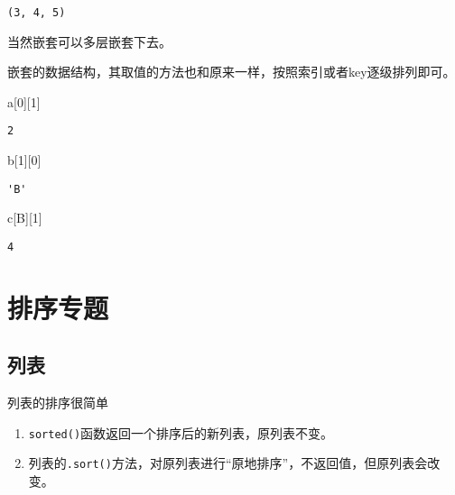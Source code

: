 \documentclass[
  letterpaper,
  DIV=11,
  numbers=noendperiod]{scrreprt}
\newenvironment{Shaded}{\begin{snugshade}}{\end{snugshade}}
\newcommand{\DecValTok}[1]{\textcolor[rgb]{0.68,0.00,0.00}{#1}}
\newcommand{\NormalTok}[1]{\textcolor[rgb]{0.00,0.23,0.31}{#1}}
\newcommand{\StringTok}[1]{\textcolor[rgb]{0.13,0.47,0.30}{#1}}
\providecommand{\tightlist}{%
  \setlength{\itemsep}{0pt}\setlength{\parskip}{0pt}}\usepackage{longtable,booktabs,array}
\begin{document}
\begin{verbatim}
(3, 4, 5)
\end{verbatim}

当然嵌套可以多层嵌套下去。

嵌套的数据结构，其取值的方法也和原来一样，按照索引或者key逐级排列即可。

\begin{Shaded}
\begin{Highlighting}[]
\NormalTok{a[}\DecValTok{0}\NormalTok{][}\DecValTok{1}\NormalTok{]}
\end{Highlighting}
\end{Shaded}

\begin{verbatim}
2
\end{verbatim}

\begin{Shaded}
\begin{Highlighting}[]
\NormalTok{b[}\DecValTok{1}\NormalTok{][}\DecValTok{0}\NormalTok{]}
\end{Highlighting}
\end{Shaded}

\begin{verbatim}
'B'
\end{verbatim}

\begin{Shaded}
\begin{Highlighting}[]
\NormalTok{c[}\StringTok{\textquotesingle{}B\textquotesingle{}}\NormalTok{][}\DecValTok{1}\NormalTok{]}
\end{Highlighting}
\end{Shaded}

\begin{verbatim}
4
\end{verbatim}

\hypertarget{ux6392ux5e8fux4e13ux9898}{%
\section{排序专题}\label{ux6392ux5e8fux4e13ux9898}}

\hypertarget{ux5217ux8868}{%
\subsection{列表}\label{ux5217ux8868}}

列表的排序很简单

\begin{enumerate}
\def\labelenumi{\arabic{enumi}.}
\tightlist
\item
  \texttt{sorted()}函数返回一个排序后的新列表，原列表不变。
\item
  列表的\texttt{.sort()}方法，对原列表进行``原地排序''，不返回值，但原列表会改变。
\end{enumerate}
\end{document}
